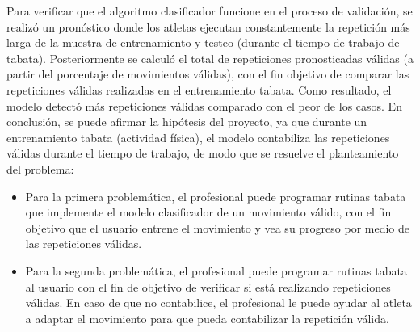 \medbreak
Para verificar que el algoritmo clasificador funcione en el proceso de validaci\'on, se realiz\'o un pron\'ostico donde los atletas ejecutan constantemente la repetici\'on m\'as larga de la muestra de entrenamiento y testeo (durante el tiempo de trabajo de tabata). Posteriormente se calcul\'o el total de repeticiones pronosticadas v\'alidas (a partir del porcentaje de movimientos v\'alidas), con el fin objetivo de comparar las repeticiones v\'alidas realizadas en el entrenamiento tabata. Como resultado, el modelo detect\'o m\'as repeticiones v\'alidas comparado con el peor de los casos.
\medbreak
En conclusi\'on, se puede afirmar la hip\'otesis del proyecto, ya que durante un entrenamiento tabata (actividad f\'isica), el modelo contabiliza las repeticiones v\'alidas durante el tiempo de trabajo, de modo que se resuelve el planteamiento del problema:
\begin{itemize}
\item	Para la primera problem\'atica, el profesional puede programar rutinas tabata que implemente el modelo clasificador de un movimiento v\'alido, con el fin objetivo que el usuario entrene el movimiento y vea su progreso por medio de las repeticiones v\'alidas.
\item	Para la segunda problem\'atica, el profesional puede programar rutinas tabata al usuario con el fin de objetivo de verificar si est\'a realizando repeticiones v\'alidas. En caso de que no contabilice, el profesional le puede ayudar al atleta a adaptar el movimiento para que pueda contabilizar la repetici\'on v\'alida.
\end{itemize}
